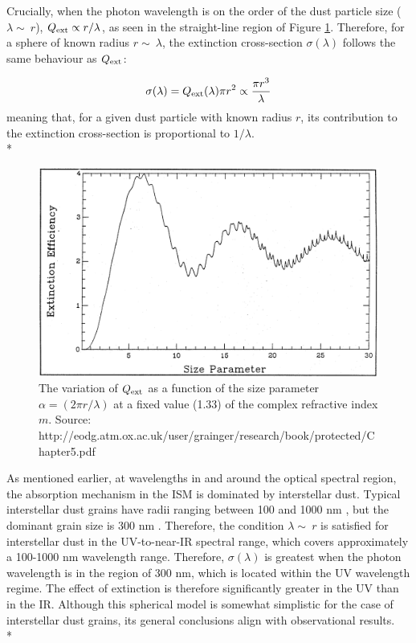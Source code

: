 \documentclass[12pt, a4paper]{report}
\begin{document}
Crucially, when the photon wavelength is on the order of the dust particle size ($\lambda \sim\ r$),  $Q_{\textnormal{ext}} \propto r/\lambda$, as seen in the straight-line region of Figure \ref{Qlambda_curve}. Therefore, for a sphere of known radius $r \sim\ \lambda$, the extinction cross-section $\sigma(\lambda)$ follows the
same behaviour as $Q_{\textnormal{ext}}$:
 
\begin{equation}
\sigma(\lambda) = Q_{\textnormal{ext}}(\lambda){\pi r^{2}} \propto \frac{\pi r^{3}}{\lambda}
\label{x_section_wavelength}
\end{equation}
meaning that, for a given dust particle with known radius $r$, its contribution to the extinction cross-section is proportional to $1/\lambda$. \\*


\begin{figure}[h!]
\begin{center}
\includegraphics[width=1.0\textwidth]{grainger_ch5_Qext_vs_wavelength.png}
\caption{The variation of $Q_{\textnormal{ext}}$ as a function of the size parameter $\alpha = (2\pi r/\lambda)$ at a fixed value (1.33) of the complex refractive index $m$. Source: http://eodg.atm.ox.ac.uk/user/grainger/research/book/protected/Chapter5.pdf}
\label{Qlambda_curve}
\end{center}
\end{figure}

As mentioned earlier, at wavelengths in and around the optical spectral region, the absorption mechanism in the ISM is dominated by interstellar dust. Typical interstellar dust grains have radii ranging between 100 and 1000 nm \citep{2000JGR...10510299W}, but the dominant grain size is 300 nm \citep{2003JGRA..108.8030L}. Therefore, the condition $\lambda \sim\ r$ is satisfied for interstellar dust in the UV-to-near-IR spectral range, which covers approximately a 100-1000 nm wavelength range. Therefore, $\sigma(\lambda)$ is greatest when the photon wavelength is in the region of 300 nm, which is located within the UV wavelength regime. The effect of extinction is therefore significantly greater in the UV than in the IR. Although this spherical model is somewhat simplistic for the case of interstellar dust grains, its general conclusions align with observational results.\\*
\end{document}
